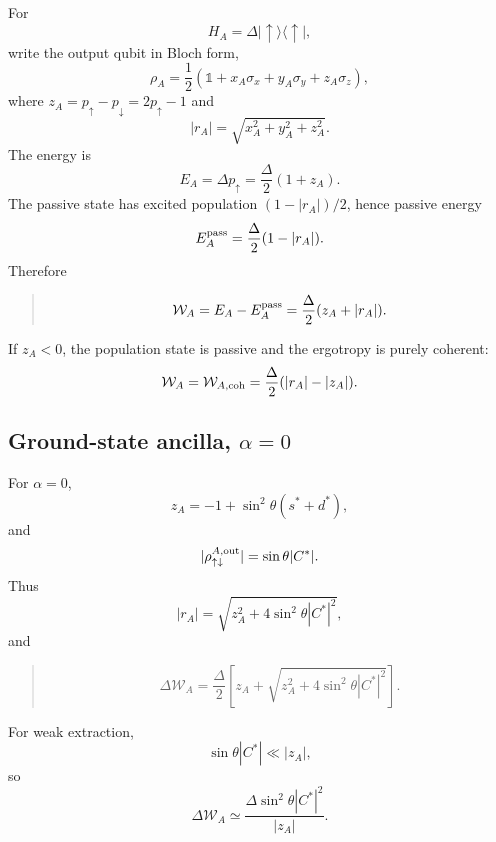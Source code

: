 \documentclass[11pt,a4paper]{article}
\newcommand{\proj}[1]{|#1\rangle\langle #1|}
\newcommand{\id}{\mathbb{1}}
\newcommand{\W}{\mathcal{W}}
\newenvironment{resultbox}{\begin{quote}\small}{\end{quote}}
\begin{document}
For
\begin{equation}
H_A=\Delta\proj{\uparrow},
\end{equation}
write the output qubit in Bloch form,
\begin{equation}
\rho_A=\frac12(\id+x_A\sigma_x+y_A\sigma_y+z_A\sigma_z),
\end{equation}
where $z_A=p_\uparrow-p_\downarrow=2p_\uparrow-1$ and
\begin{equation}
|r_A|=\sqrt{x_A^2+y_A^2+z_A^2}.
\end{equation}
The energy is
\begin{equation}
E_A=\Delta p_\uparrow=\frac{\Delta}{2}(1+z_A).
\end{equation}
The passive state has excited population $(1-|r_A|)/2$, hence passive energy
\begin{equation}
E_A^{\rm pass}=\frac{\Delta}{2}(1-|r_A|).
\end{equation}
Therefore
\begin{resultbox}
\begin{equation}
\W_A=E_A-E_A^{\rm pass}=\frac{\Delta}{2}(z_A+|r_A|).
\end{equation}
\end{resultbox}
If $z_A<0$, the population state is passive and the ergotropy is purely coherent:
\begin{equation}
\W_A=\W_{A,{\rm coh}}=\frac{\Delta}{2}(|r_A|-|z_A|).
\end{equation}

\subsection{Ground-state ancilla, $\alpha=0$}

For $\alpha=0$,
\begin{equation}
z_A=-1+\sin^2\theta(s^*+d^*),
\end{equation}
and
\begin{equation}
|\rho_{\uparrow\downarrow}^{A,{\rm out}}|=\sin\theta|C^*|.
\end{equation}
Thus
\begin{equation}
|r_A|=\sqrt{z_A^2+4\sin^2\theta|C^*|^2},
\end{equation}
and
\begin{resultbox}
\begin{equation}
\Delta\W_A=\frac{\Delta}{2}\left[z_A+\sqrt{z_A^2+4\sin^2\theta|C^*|^2}\right].
\end{equation}
\end{resultbox}
For weak extraction,
\begin{equation}
\sin\theta|C^*|\ll |z_A|,
\end{equation}
so
\begin{equation}
\Delta\W_A\simeq \frac{\Delta\sin^2\theta|C^*|^2}{|z_A|}.
\end{equation}
\end{document}
